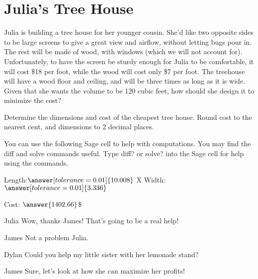 \documentclass{ximera}
\begin{document}
\section{Julia's Tree House}
Julia is building a tree house for her younger cousin. She'd like two opposite sides to be large screens to give a great view and airflow, without letting bugs pour in. The rest will be made of wood, with windows (which we will not account for). Unfortunately, to have the screen be sturdy enough for Julia to be comfortable, it will cost \$18 per foot, while the wood will cost only \$7 per foot. The treehouse will have a wood floor and ceiling, and will be three times as long as it is wide. Given that she wants the volume to be 120 cubic feet, how should she design it to minimize the cost?
\begin{question}
Determine the dimensions and cost of the cheapest tree house. Round cost to the nearest cent, and dimensions to 2 decimal places.

You can use the following Sage cell to help with computations. You may find the diff and solve commands useful. Type diff? or solve? into the Sage cell for help using the commands.
\begin{onlineOnly}
\begin{sageCell}

\end{sageCell}
\end{onlineOnly}

Length:$\answer[tolerance=0.01]{10.008}$ X Width:$\answer[tolerance=0.01]{3.336}$

Cost: $\answer{1402.66}$\$
\end{question}

\begin{dialogue}
\item[Julia] Wow, thanks James! That's going to be a real help!
\item[James] Not a problem Julia.
\item[Dylan] Could you help my little sister with her lemonade stand?
\item[James] Sure, let's look at how she can maximize her profits!
\end{dialogue}
\end{document}
